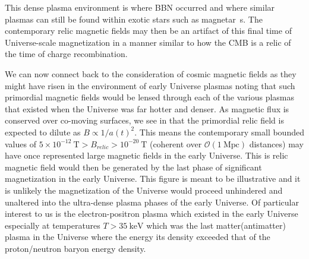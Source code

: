 
This dense plasma environment is where BBN occurred and where similar plasmas can still be found within exotic stars such as magnetar~\cite{Broderick:2000pe}s. The contemporary relic magnetic fields may then be an artifact of this final time of Universe-scale magnetization in a manner similar to how the CMB is a relic of the time of charge recombination.

We can now connect back to the consideration of cosmic magnetic fields as they might have risen in the environment of early Universe plasmas noting that such primordial magnetic fields would be lensed through each of the various plasmas that existed when the Universe was far hotter and denser. As magnetic flux is conserved over co-moving surfaces, we see in  that the primordial relic field is expected to dilute as $B\propto1/a(t)^{2}$. This means the contemporary small bounded values of $5\times10^{-12}\ \mathrm{T}>B_{relic}>10^{-20}\ \mathrm{T}$ (coherent over $\mathcal{O}(1\ \mathrm{Mpc})$ distances) may have once represented large magnetic fields in the early Universe. This is relic magnetic field would then be generated by the last phase of significant magnetization in the early Universe. This figure is meant to be illustrative and it is unlikely the magnetization of the Universe would proceed unhindered and unaltered into the ultra-dense plasma phases of the early Universe. Of particular interest to us is the electron-positron plasma which existed in the early Universe especially at temperatures $T>35\ \mathrm{keV}$ which was the last matter(antimatter) plasma in the Universe where the energy its density exceeded that of the proton/neutron baryon energy density.